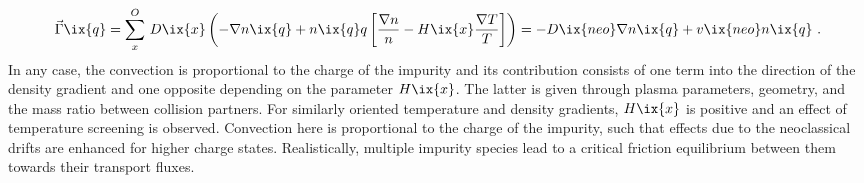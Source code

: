                 \begin{align}%
                    \vec{\Gamma}\ix{q}=\sum^{O}_{x}\,D\ix{x}\left(-\nabla n\ix{q}+n\ix{q}q\left[\frac{\nabla n}{n}-H\ix{x}\frac{\nabla T}{T}\right]\right)=-D\ix{neo}\nabla n\ix{q}+v\ix{neo}n\ix{q}\,\,.\nonumber%
                \end{align}%
%
                In any case, the convection is proportional to the charge of the impurity and its contribution consists of one term into the direction of the density gradient and one opposite depending on the parameter $H\ix{x}$. The latter is given through plasma parameters, geometry, and the mass ratio between collision partners. For similarly oriented temperature and density gradients, $H\ix{x}$ is positive and an effect of temperature screening is observed. Convection here is proportional to the charge of the impurity, such that effects due to the neoclassical drifts are enhanced for higher charge states. Realistically, multiple impurity species lead to a critical friction equilibrium between them towards their transport fluxes\cite{Dux2000,Dux2004}.%
%
